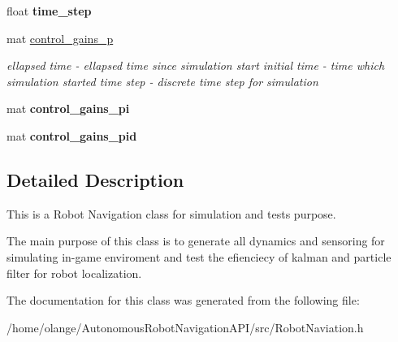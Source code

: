 \begin{DoxyCompactItemize}
\item 
\mbox{\label{class_robot_navigation_a1f1de08123eaff99571bb21fa411d4dd}} 
float {\bfseries time\+\_\+step}
\item 
\mbox{\label{class_robot_navigation_ad7ff88f46b33d23be62fc365b650361e}} 
mat \hyperlink{class_robot_navigation_ad7ff88f46b33d23be62fc365b650361e}{control\+\_\+gains\+\_\+p}
\begin{DoxyCompactList}\small\item\em ellapsed time -\/ ellapsed time since simulation start initial time -\/ time which simulation started time step -\/ discrete time step for simulation \end{DoxyCompactList}\item 
\mbox{\label{class_robot_navigation_a90738c7f4f1a884edce67e44769b284b}} 
mat {\bfseries control\+\_\+gains\+\_\+pi}
\item 
\mbox{\label{class_robot_navigation_a0f450c83221af7ef3e276b65ebfdc50d}} 
mat {\bfseries control\+\_\+gains\+\_\+pid}
\end{DoxyCompactItemize}


\subsection{Detailed Description}
This is a Robot Navigation class for simulation and tests purpose. 

The main purpose of this class is to generate all dynamics and sensoring for simulating in-\/game enviroment and test the efienciecy of kalman and particle filter for robot localization. 

The documentation for this class was generated from the following file\+:\begin{DoxyCompactItemize}
\item 
/home/olange/\+Autonomous\+Robot\+Navigation\+A\+P\+I/src/Robot\+Naviation.\+h\end{DoxyCompactItemize}
